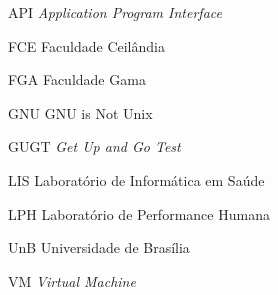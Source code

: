 \begin{siglas}
\item[API] \emph{Application Program Interface}
	\item[FCE] Faculdade Ceilândia 
	\item[FGA] Faculdade Gama
	\item[GNU] GNU is Not Unix
	\item[GUGT] \emph{Get Up and Go Test}
	\item[LIS] Laboratório de Informática em Saúde
	\item[LPH] Laboratório de Performance Humana
	\item[UnB] Universidade de Brasília
	\item[VM] \emph{Virtual Machine}

\begin{comment}
\item[AC]  Aquisição do Conhecimento
\item[ACM] \textit{Association for Computing Machinery}
\item[ACR] \textit{American College of Radiology}
\item[BI-RADS] Sistema de Laudos e Registros de Dados de Imagens da Mama
\item[caBIG]  \textit{Cancer Biomedical Informatics Grid}
\item[CADe] \textit{Computer-aided Detection}
\item[CADx]  \textit{Computer-aided Diagnosis}
\item[CAE]  Controle Automático de Exposição
\item[CAR]  \textit{Computer-Assisted Radiology}
\item[CC] Incidência Craniocaudal
\item[CDA]  \textit{HL7 Clinical Document Architecture}
\item[CBEB]  Congresso Brasileiro de Engenharia Biomédica
\item[CEN]  \textit{Comité Européen de Normalisation}
\item[CMS]  \textit{Clinical Management System}
\item[CRT]  \textit{Cathode-Ray Tube}
\item[DICOM] \textit{Digital Imaging Communications in Medicine}
\item[DIN/PACS]  \textit{Installation Site for Digital Imaging Network and PACS}
\item[DMWL] \textit{DICOM Modality Worklist}
\item[EC]  Elicitação de Conhecimento
\item[FDA]  \textit{Food and Drug Administration}

\end{comment}
\end{siglas}
